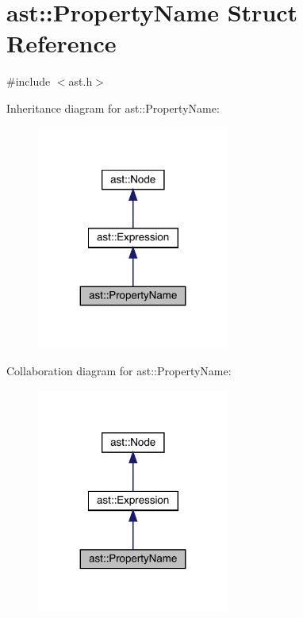 \hypertarget{structast_1_1_property_name}{}\section{ast\+:\+:Property\+Name Struct Reference}
\label{structast_1_1_property_name}


{\ttfamily \#include $<$ast.\+h$>$}



Inheritance diagram for ast\+:\+:Property\+Name\+:
\nopagebreak
\begin{figure}[H]
\begin{center}
\leavevmode
\includegraphics[width=179pt]{structast_1_1_property_name__inherit__graph}
\end{center}
\end{figure}


Collaboration diagram for ast\+:\+:Property\+Name\+:
\nopagebreak
\begin{figure}[H]
\begin{center}
\leavevmode
\includegraphics[width=179pt]{structast_1_1_property_name__coll__graph}
\end{center}
\end{figure}
